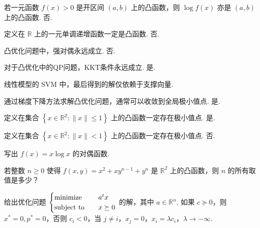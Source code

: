 \begin{problem}[判断]
    若一元函数 $f(x) > 0$ 是开区间 $(a, b)$ 上的凸函数，则 $\log f(x)$ 亦是 $(a, b)$ 上的凸函数.
    \Answer 否.
\end{problem}

\begin{problem}[判断]
    定义在 $\mathbb{R}$ 上的一元单调递增函数一定是凸函数.
    \Answer 否.
\end{problem}

\begin{problem}[判断]
    凸优化问题中，强对偶永远成立.
    \Answer 否.
\end{problem}

\begin{problem}[判断]
    对于凸优化中的QP问题，KKT条件永远成立.
    \Answer 是.
\end{problem}

\begin{problem}[判断]
    线性模型的 SVM 中，最后得到的解仅依赖于支撑向量.
    \Answer 
\end{problem}

\begin{problem}[判断]
    通过梯度下降方法求解凸优化问题，通常可以收敛到全局极小值点.
    \Answer 是.
\end{problem}

\begin{problem}[判断]
    定义在集合 $\left\{x \in \mathbb{R}^2: \|x\| \le 1\right\}$ 上的凸函数一定存在极小值点.
    \Answer 是.
\end{problem}

\begin{problem}[判断]
    定义在集合 $\left\{x \in \mathbb{R}^2: \|x\| < 1\right\}$ 上的凸函数一定存在极小值点.
    \Answer 否.
\end{problem}

\begin{problem}[问答]
    写出 $f(x) = x\log x$ 的对偶函数.
    \Answer 
\end{problem}

\begin{problem}[问答]
    若整数 $n \ge 0$ 使得 $f(x, y) = x^2 + xy^{n - 1} + y^n$ 是 $\mathbb{R}^2$ 上的凸函数，则 $n$ 的所有取值是多少？
    \Answer 
\end{problem}

\begin{problem}[问答]
    给出优化问题 $\begin{cases}
        \operatorname{minimize} \quad & a^tx\\
        \operatorname{subject\ to} \quad & x \succeq 0
    \end{cases}$ 的解，其中 $a\in \mathbb{R}^n$.
    \Answer 如果 $c \succeq 0$，则 $x^* = 0, p^* = 0$，否则 $c_i < 0$，当 $j \neq i$，$x_j = 0$，$x_i = \lambda c_i$，$\lambda \to -\infty$.
\end{problem}

